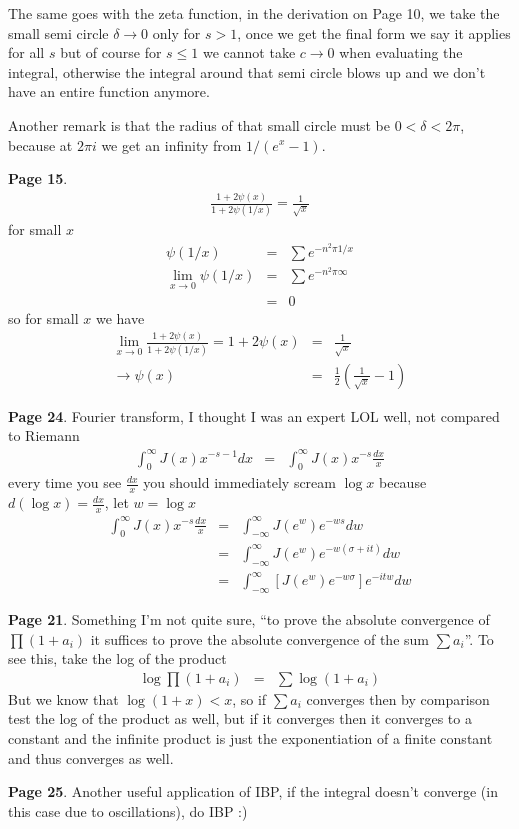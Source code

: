 \documentclass[aps,preprint,preprintnumbers,nofootinbib,showpacs,prd]{revtex4-1}
\newcommand{\nbea}{\begin{eqnarray*}}
\newcommand{\neea}{\end{eqnarray*}}
\begin{document}
The same goes with the zeta function, in the derivation on Page 10, we take the small semi circle $\delta \to 0$ only for $s > 1$, once we get the final form we say it applies for all $s$ but of course for $s \le 1$ we cannot take $c\to0$ when evaluating the integral, otherwise the integral around that semi circle blows up and we don't have an entire function anymore.

Another remark is that the radius of that small circle must be $0 < \delta < 2\pi$, because at $2\pi i$ we get an infinity from $1/(e^x-1)$.

{\bf Page 15}.
%
\nbea
\frac{1 + 2\psi(x)}{1 + 2\psi(1/x)} = \frac{1}{\sqrt{x}}
\neea
%
for small $x$
%
\nbea
\psi(1/x) & = & \sum e^{-n^2 \pi 1/x} \\
\lim_{x\to 0} \psi(1/x) & = & \sum e^{-n^2 \pi \infty} \\
& = & 0
\neea
%
so for small $x$ we have
%
\nbea
\lim_{x\to 0} \frac{1 + 2\psi(x)}{1 + 2\psi(1/x)} = 1 + 2\psi(x) & = & \frac{1}{\sqrt{x}} \\
\to \psi(x) & = & \frac{1}{2} \left( \frac{1}{\sqrt{x}} - 1\right)
\neea
%

{\bf Page 24}. Fourier transform, I thought I was an expert LOL well, not compared to Riemann
%
\nbea
\int_0^\infty J(x) x^{-s-1} dx & = & \int_0^\infty J(x) x^{-s} \frac{dx}{x}
\neea
%
every time you see $\frac{dx}{x}$ you should immediately scream $\log x$ because $d(\log x) = \frac{dx}{x}$, let $w = \log x$
%
\nbea
\int_0^\infty J(x) x^{-s} \frac{dx}{x} & = & \int_{-\infty}^\infty J(e^w)e^{-ws} dw \\
& = & \int_{-\infty}^\infty J(e^w)e^{-w(\sigma + it)} dw \\
& = & \int_{-\infty}^\infty \left\lbrack J(e^w)e^{-w\sigma} \right\rbrack e^{-itw} dw
\neea
%

{\bf Page 21}. Something I'm not quite sure, ``to prove the absolute convergence of $\prod(1 + a_i)$ it suffices to prove the absolute convergence of the sum $\sum {a_i}$''. To see this, take the log of the product
%
\nbea
\log \prod(1 + a_i) & = & \sum \log(1 + a_i)
\neea
%
But we know that $\log(1 + x) < x$, so if $\sum a_i$ converges then by comparison test the log of the product as well, but if it converges then it converges to a constant and the infinite product is just the exponentiation of a finite constant and thus converges as well.

{\bf Page 25}. Another useful application of IBP, if the integral doesn't converge (in this case due to oscillations), do IBP :)
\end{document}
